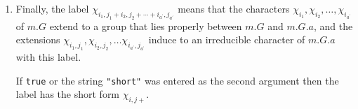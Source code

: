 \documentclass[a4paper,11pt]{report}
\begin{document}
{{{\begin{enumerate}
 If either \texttt{true} or the string \texttt{"short"} is entered as the second argument then the label has the short form $\chi_{{i_1+}}$. Note that $i_2, i_3, \ldots, i_a$ can be read off from the fusion signs in the \textsf{Atlas}. 
\item  Finally, the label $\chi_{{i_1,j_1 + i_2,j_2 + \cdots + i_{{a^\prime}},j_{{a^\prime}}}}$ means that the characters $\chi_{{i_1}}, \chi_{{i_2}}, \ldots, \chi_{{i_{{a^\prime}}}}$ of $m.G$ extend to a group that lies properly between $m.G$ and $m.G.a$, and the extensions $\chi_{{i_1, j_1}}, \chi_{{i_2, j_2}}, \ldots
\chi_{{i_{{a^\prime}},j_{{a^\prime}}}}$ induce to an irreducible character of $m.G.a$ with this label. 

 If \texttt{true} or the string \texttt{"short"} was entered as the second argument then the label has the short form $\chi_{{i,j+}}$. 
\end{enumerate}
 

}}}
\end{document}
